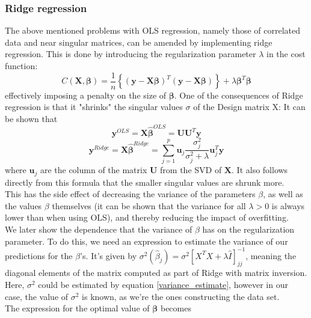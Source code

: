 \documentclass[11pt,a4paper,titlepage]{article}
\begin{document}
\subsubsection{Ridge regression}
The above mentioned problems with OLS regression, namely those of correlated data and near singular matrices, can be amended by implementing ridge regression. This is done by introducing the regularization parameter $ \lambda$ in the cost function:
\begin{equation*}
    C(\boldsymbol{X},\boldsymbol{\beta})=\frac{1}{n}\left\{(\boldsymbol{y}-\boldsymbol{X}\boldsymbol{\beta})^T(\boldsymbol{y}-\boldsymbol{X}\boldsymbol{\beta})\right\}+\lambda\boldsymbol{\beta}^T\boldsymbol{\beta}
\end{equation*}
effectively imposing a penalty on the size of $\boldsymbol{\beta}$. One of the consequences of Ridge regression is that it "shrinks" the singular values $\sigma$ of the Design matrix X: It can be shown that \citep{hastie01statisticallearning}
\begin{equation*}
\bm{y}^{OLS}=\bm{X\hat\beta}^{OLS}=\bm{UU}^T\bm{y}
\end{equation*}
\begin{equation*}
\bm{y}^{Ridge}=\bm{X\hat\beta}^{Ridge}=\sum_{j=1}^{p}\bm{u}_j\frac{\sigma_j^2}{\sigma_j^2+\lambda}\bm{u}^T_j\bm{y}
\end{equation*}
where $\bm{u}_j$ are the column of the matrix $\bm{U}$ from the SVD of $\bm{X}$. It also follows directly from this formula that the smaller singular values are shrunk more.\\
This has the side effect of decreasing the variance of the parameters $\beta$, as well as the values $\beta$ themselves (it can be shown \citep{Ridge_Lecture_Notes} that the variance for all $\lambda>0$ is always lower than when using OLS), and thereby reducing the impact of overfitting.\\We later show the dependence that the variance of $\beta$ has on the regularization parameter. To do this, we need an expression to estimate the variance of our predictions for the $\beta$'s. It's given by $\sigma^2(\hat{\beta}_j) = \sigma^2[X^TX+\lambda \hat{I}]^{-1}_{jj}$\cite{HW1}\cite{HW2}, meaning the diagonal elements of the matrix computed as part of Ridge with matrix inversion. Here, $\sigma^2$ could be estimated by equation \eqref{variance_estimate}\citep{hastie01statisticallearning}, however in our case, the value of $\sigma^2$ is known, as we're the ones constructing the data set.\\The expression for the optimal value of $\boldsymbol{\beta}$ becomes
\end{document}
